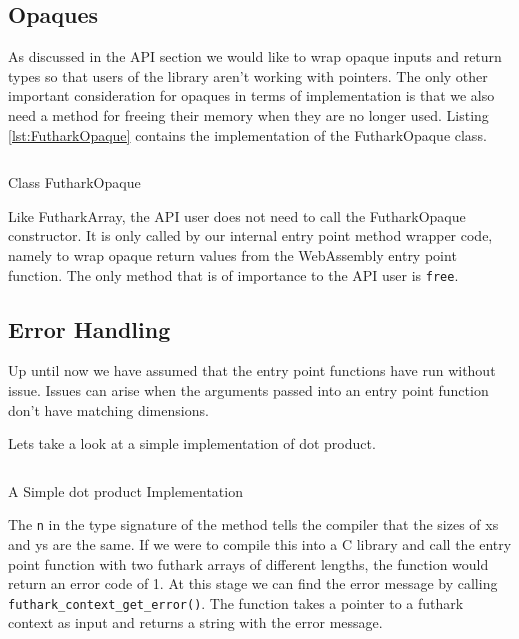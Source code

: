 \documentclass[11pt]{book}
\begin{document}
\subsection{Opaques}

As discussed in the API section we would like to wrap opaque inputs and return types so that users of the library aren't working with pointers. The only other important consideration for opaques in terms of implementation is that we also need a method for freeing their memory when they are no longer used. Listing \ref{lst:FutharkOpaque} contains the implementation of the FutharkOpaque class.

\begin{listing}[H] 
        \inputminted[fontsize=\small,baselinestretch=0.5,linenos]{JavaScript}{code/compiler/api_examples/FutharkOpaque.js}
        \caption{Class FutharkOpaque}
        \label{lst:FutharkOpaque}    
\end{listing} 

Like FutharkArray, the API user does not need to call the FutharkOpaque constructor. It is only called by our internal entry point method wrapper code, namely to wrap opaque return values from the WebAssembly entry point function. The only method that is of importance to the API user is \texttt{free}. 


\subsection{Error Handling}

Up until now we have assumed that the entry point functions have run without issue. Issues can arise when the arguments passed into an entry point function don't have matching dimensions. 

Lets take a look at a simple implementation of dot product.
\begin{listing}[H] 
        \inputminted[fontsize=\small,baselinestretch=0.5,linenos]{JavaScript}{code/examples/futhark/dotprod.fut}
        \caption{A Simple dot product Implementation}
        \label{lst:dotprod}    
\end{listing} 

The \texttt{n} in the type signature of the method tells the compiler that the sizes of xs and ys are the same. If we were to compile this into a C library and call the entry point function with two futhark arrays of different lengths, the function would return an error code of 1. At this stage we can find the error message by calling \texttt{futhark\_context\_get\_error()}. The function takes a pointer to a futhark context as input and returns a string with the error message. 
\end{document}
